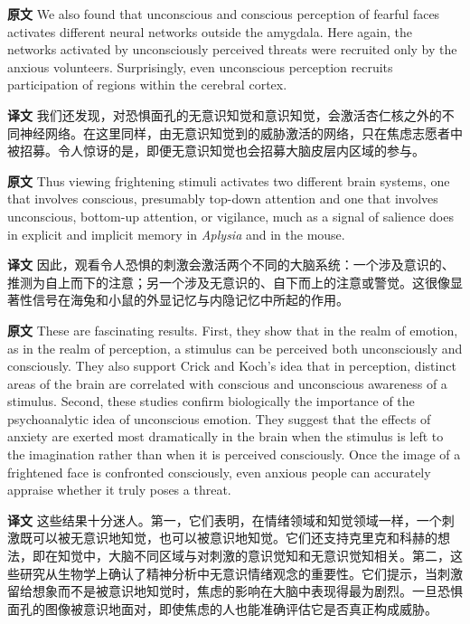 \documentclass[UTF8]{ctexart}
\newenvironment{english}{\par\small\noindent\textbf{原文}\quad\ignorespaces}{\par}
\newenvironment{zhtranslation}{\par\noindent\textbf{译文}\quad\ignorespaces}{\par\vspace{0.35em}}
\begin{document}
\begin{english}
We also found that unconscious and conscious perception of fearful faces activates different neural networks outside the amygdala. Here again, the networks activated by unconsciously perceived threats were recruited only by the anxious volunteers. Surprisingly, even unconscious perception recruits participation of regions within the cerebral cortex.
\end{english}
\begin{zhtranslation}
我们还发现，对恐惧面孔的无意识知觉和意识知觉，会激活杏仁核之外的不同神经网络。在这里同样，由无意识知觉到的威胁激活的网络，只在焦虑志愿者中被招募。令人惊讶的是，即便无意识知觉也会招募大脑皮层内区域的参与。\end{zhtranslation}

\begin{english}
Thus viewing frightening stimuli activates two different brain systems, one that involves conscious, presumably top-down attention and one that involves unconscious, bottom-up attention, or vigilance, much as a signal of salience does in explicit and implicit memory in \emph{Aplysia} and in the mouse.
\end{english}
\begin{zhtranslation}
因此，观看令人恐惧的刺激会激活两个不同的大脑系统：一个涉及意识的、推测为自上而下的注意；另一个涉及无意识的、自下而上的注意或警觉。这很像显著性信号在海兔和小鼠的外显记忆与内隐记忆中所起的作用。\end{zhtranslation}

\begin{english}
These are fascinating results. First, they show that in the realm of emotion, as in the realm of perception, a stimulus can be perceived both unconsciously and consciously. They also support Crick and Koch's idea that in perception, distinct areas of the brain are correlated with conscious and unconscious awareness of a stimulus. Second, these studies confirm biologically the importance of the psychoanalytic idea of unconscious emotion. They suggest that the effects of anxiety are exerted most dramatically in the brain when the stimulus is left to the imagination rather than when it is perceived consciously. Once the image of a frightened face is confronted consciously, even anxious people can accurately appraise whether it truly poses a threat.
\end{english}
\begin{zhtranslation}
这些结果十分迷人。第一，它们表明，在情绪领域和知觉领域一样，一个刺激既可以被无意识地知觉，也可以被意识地知觉。它们还支持克里克和科赫的想法，即在知觉中，大脑不同区域与对刺激的意识觉知和无意识觉知相关。第二，这些研究从生物学上确认了精神分析中无意识情绪观念的重要性。它们提示，当刺激留给想象而不是被意识地知觉时，焦虑的影响在大脑中表现得最为剧烈。一旦恐惧面孔的图像被意识地面对，即使焦虑的人也能准确评估它是否真正构成威胁。\end{zhtranslation}
\end{document}
